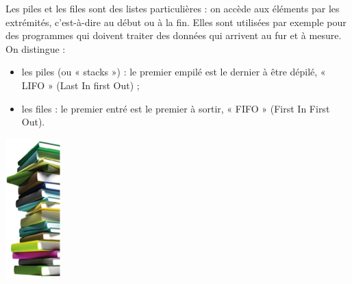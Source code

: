 \begin{minipage}[c]{0.8\linewidth}
\begin{defi}
Les piles et les files sont des listes particulières : on accède aux éléments par les extrémités, c’est-à-dire au début ou à la fin. Elles sont utilisées par exemple pour des programmes qui doivent traiter des données qui arrivent au fur et à mesure. On distingue :
\begin{itemize}
\item les piles (ou « stacks ») : le premier empilé est le dernier à être dépilé, « LIFO » (Last In first Out) ;
\item les files : le premier entré est le premier à sortir, « FIFO » (First In First Out).
\end{itemize}
\end{defi}
\end{minipage}
\hfill%
\begin{minipage}[c]{0.2\linewidth}
\begin{center}
\includegraphics[height=1.4\textwidth]{images/pile3.png}
\end{center}
\end{minipage}


